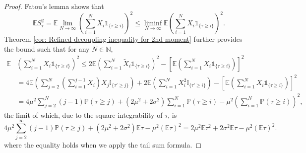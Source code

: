 \documentclass[ECP]{ejpecp} %
\newcommand{\II}{\mathbb{I}}
\newcommand{\lpar}{\left(}
\newcommand{\rpar}{\right)}
\newcommand{\lbr}{\left[}
\newcommand{\rbr}{\right]}
\newcommand{\pro}{\mathbb{P}}
\newcommand{\E}{\mathbb{E}}
\newcommand{\N}{\mathbb{N}}
\newcommand{\tX}{\tilde{X}}
\newcommand{\one}{\mathds{1}}
\begin{document}
\begin{proof}
    Fatou's lemma shows that 
    \[ \E S^2_\tau = \E \lim\limits_{N\rightarrow \infty} \lpar \sum\limits_{i=1}^N X_i \one_{\{\tau \geq i\}} \rpar^2 \leq \liminf\limits_{N\rightarrow \infty}  \E \lpar \sum\limits_{i=1}^N X_i \one_{\{\tau \geq i\}} \rpar^2.\]
    Theorem \ref{cor: Refined decoupling inequality for 2nd moment} further provides the bound such that for any $N\in \N$,
    \begin{align*}
         \E &\lpar \sum\limits_{i=1}^N X_i \one_{\{\tau \geq i\}} \rpar^2   \leq 2\E \lpar \sum\limits_{i=1}^N \tX_i \one_{\{\tau \geq i\}} \rpar^2 - \lbr \E \lpar \sum\limits_{i=1}^N X_i \one_{\{\tau \geq i\}}\rpar \rbr^2  \\
         & = 4\E \lpar \sum\limits_{j=2}^N (\sum\limits_{i=1}^{j-1} X_i) X_j \II_{\{\tau'\geq j\}} \rpar + 2 \E \lpar \sum\limits_{i= 1}^N X_i^2 \II_{\{\tau'\geq i\}} \rpar - \lbr \E \lpar \sum\limits_{i=1}^N X_i \one_{\{\tau \geq i\}}\rpar \rbr^2 \\
         & = 4 \mu^2  \sum\limits_{j=2}^N (j-1) \pro(\tau \geq j) +  (2\mu^2+2\sigma^2) \sum\limits_{i=1}^N \pro(\tau\geq i)  -\mu^2\lpar  \sum\limits_{i=1}^N  \pro(\tau\geq i)\rpar^2,
    \end{align*}
    the limit of which, due to the square-integrability of $\tau$, is 
    \begin{equation}
        \label{equ: upper bound randomly stopped process}
        4 \mu^2  \sum\limits_{j=2}^\infty (j-1) \pro(\tau \geq j) +  (2\mu^2+2\sigma^2) \E \tau - \mu^2 (\E \tau)^2= 2 \mu^2 \E\tau^2 + 2\sigma^2 \E \tau - \mu^2 (\E \tau)^2.
    \end{equation}
    where the equality holds when we apply the tail sum formula.
    

\end{proof}
\end{document}

